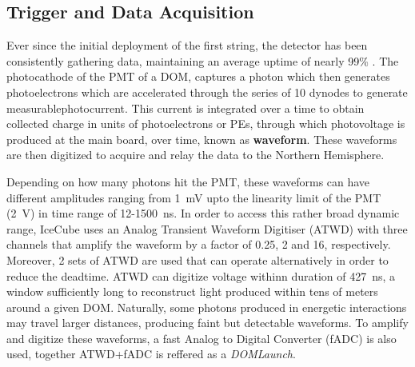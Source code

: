 \subsection{Trigger and Data Acquisition}
\label{sec:DAQ}
Ever since the initial deployment of the first string, the detector has been consistently gathering data, maintaining an average uptime of nearly 99\% . The photocathode of the PMT of a DOM, captures a photon which then generates photoelectrons which are accelerated through the series of 10 dynodes to generate measurablephotocurrent. This current is integrated over a time to obtain collected charge in units of photoelectrons or PEs, through which photovoltage is produced at the main board, over time, known as \textbf{waveform}. These waveforms are then digitized to acquire and relay the data to the Northern Hemisphere.

Depending on how many photons hit the PMT, these waveforms can have different amplitudes ranging from 1~mV upto the linearity limit of the PMT (2~V) in time range of 12-1500~ns. In order to access this rather broad dynamic range, IceCube uses an Analog Transient Waveform Digitiser (ATWD) with three channels that amplify the waveform by a factor of 0.25, 2 and 16, respectively. Moreover, 2 sets of ATWD are used that can operate alternatively in order to reduce the deadtime. ATWD can digitize voltage withinn duration of 427~ns, a window sufficiently long to reconstruct light produced within tens of meters around a given DOM. Naturally, some photons produced in energetic interactions may travel larger distances, producing faint but detectable waveforms. To amplify and digitize these waveforms, a fast Analog to Digital Converter (fADC) is also used, together ATWD+fADC is reffered as a \emph{DOMLaunch}.

